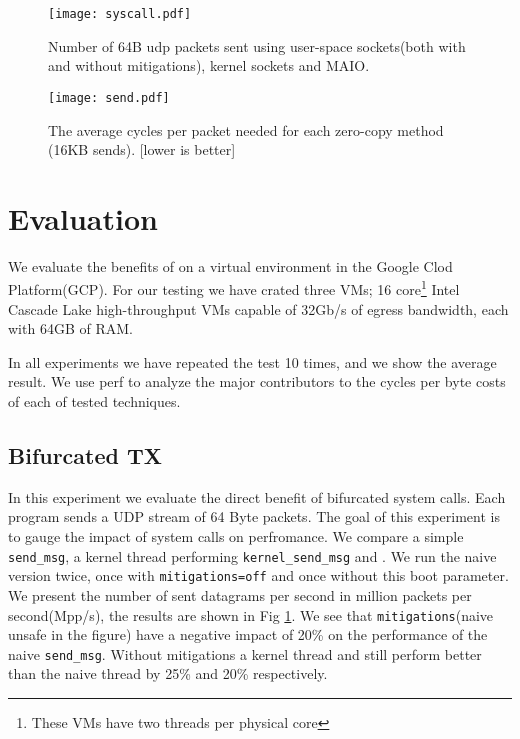 \begin{figure}[t]
    \centering
    \texttt{[image: syscall.pdf]}
    \caption{Number of 64B udp packets sent using user-space sockets(both with and without mitigations), kernel sockets and MAIO.} 
    \label{fig:pps}
\end{figure}
\begin{figure}[t]
    \centering
    \texttt{[image: send.pdf]}
    \caption{The average cycles per packet needed for each zero-copy method (16KB sends). [lower is better]}
    \label{fig:tx_compare}
\end{figure}
\section{Evaluation}\label{sec:eval}
We evaluate the benefits of \oursys on a virtual environment in the Google Clod Platform(GCP).
For our testing we have crated three VMs; 16 core\footnote{These VMs have two threads per physical core} Intel Cascade Lake high-throughput VMs capable of 32Gb/s of egress bandwidth\cite{gcp}, each with 64GB of RAM.

In all experiments we have repeated the test 10 times, and we show the average result. We use perf\cite{perf} to analyze the major contributors to the cycles per byte costs of each of tested techniques.

\subsection{Bifurcated TX}\label{sec:eval_bif}
In this experiment we evaluate the direct benefit of bifurcated system calls. Each program sends a UDP stream of 64 Byte packets. The goal of this experiment is to gauge the impact of system calls on perfromance. We compare a simple \texttt{send\_msg}, a kernel thread performing \texttt{kernel\_send\_msg} and \oursys. We run the naive version twice, once with \texttt{mitigations=off}\cite{mitigations} and once without this boot parameter. We present the number of sent datagrams per second in million packets per second(Mpp/s), the results are shown in Fig \ref{fig:pps}. We see that \texttt{mitigations}(naive unsafe in the figure) have a negative impact of 20\% on the performance of the naive \texttt{send\_msg}. Without mitigations a kernel thread and \oursys still perform better than the naive thread by 25\% and 20\% respectively.

